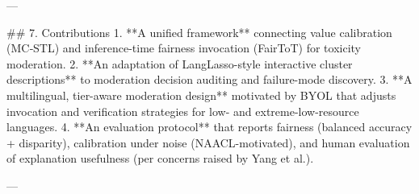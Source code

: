 ---

## 7. Contributions
1. **A unified framework** connecting value calibration (MC‑STL) and inference-time fairness invocation (FairToT) for toxicity moderation.  
2. **An adaptation of LangLasso-style interactive cluster descriptions** to moderation decision auditing and failure-mode discovery.  
3. **A multilingual, tier-aware moderation design** motivated by BYOL that adjusts invocation and verification strategies for low- and extreme-low-resource languages.  
4. **An evaluation protocol** that reports fairness (balanced accuracy + disparity), calibration under noise (NAACL-motivated), and human evaluation of explanation usefulness (per concerns raised by Yang et al.).

---